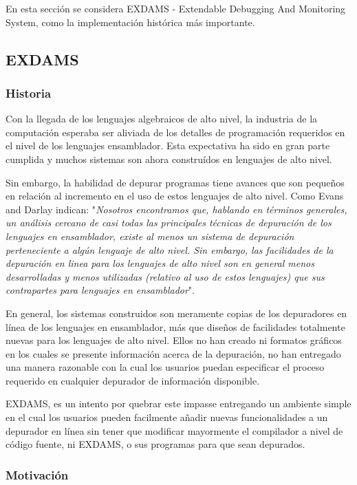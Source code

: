 \documentclass[12pt,legalpaper]{report}
\begin{document}
En esta sección se considera EXDAMS - Extendable Debugging And Monitoring System, como la implementación histórica más importante.

		\subsection{EXDAMS}
			\subsubsection{Historia}

Con la llegada de los lenguajes algebraicos de alto nivel, la industria de la computación esperaba ser aliviada de los detalles de programación requeridos en el nivel de los lenguajes ensamblador.  Esta expectativa ha sido en gran parte cumplida y muchos sistemas son ahora construídos en lenguajes de alto nivel.

Sin embargo, la habilidad de depurar programas tiene avances que son pequeños en relación al incremento en el uso de estos lenguajes de alto nivel.  Como Evans and Darlay \cite{EvansDarlay} indican:
"\textit{Nosotros encontramos que, hablando en términos generales, un análisis cercano de casi todas las principales técnicas de depuración de los lenguajes en ensamblador, existe al menos un sistema de depuración perteneciente a algún lenguaje de alto nivel.  Sin embargo, las facilidades de la depuración en linea para los lenguajes de alto nivel son en general menos desarrolladas y menos utilizadas (relativo al uso de estos lenguajes) que sus contrapartes para lenguajes en ensamblador}".

En general, los sistemas construidos son meramente copias de los depuradores en línea de los lenguajes en ensamblador, más que diseños de facilidades totalmente nuevas para los lenguajes de alto nivel.  Ellos no han creado ni formatos gráficos en los cuales se presente información acerca de la depuración, no han entregado una manera razonable con la cual los usuarios puedan especificar el proceso requerido en cualquier depurador de información disponible.

EXDAMS, es un intento por quebrar este impasse entregando un ambiente simple en el cual los usuarios pueden facilmente añadir nuevas funcionalidades a un depurador en línea sin tener que modificar mayormente el compilador a nivel de código fuente, ni EXDAMS, o sus programas para que sean depurados.


			\subsubsection{Motivación}
\end{document}
